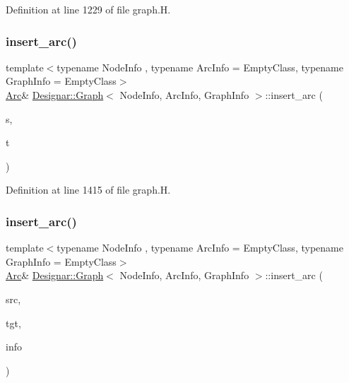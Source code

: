Definition at line 1229 of file graph.\+H.

\mbox{\label{class_designar_1_1_graph_a794e687e21db6f4e00e14c6bdc5c2907}} 
\subsubsection{\texorpdfstring{insert\+\_\+arc()}{insert\_arc()}\hspace{0.1cm}{\footnotesize\ttfamily [2/4]}}
{\footnotesize\ttfamily template$<$typename Node\+Info , typename Arc\+Info  = Empty\+Class, typename Graph\+Info  = Empty\+Class$>$ \\
\hyperlink{class_designar_1_1_graph_a74c730ef4ce2d20f998d72bd25c2b5bf}{Arc}\& \hyperlink{class_designar_1_1_graph}{Designar\+::\+Graph}$<$ Node\+Info, Arc\+Info, Graph\+Info $>$\+::insert\+\_\+arc (\begin{DoxyParamCaption}\item[{\hyperlink{class_designar_1_1_graph_a5dfc7dba9d092ac489c72e40390c37d0}{Node} \&}]{s,  }\item[{\hyperlink{class_designar_1_1_graph_a5dfc7dba9d092ac489c72e40390c37d0}{Node} \&}]{t }\end{DoxyParamCaption})\hspace{0.3cm}{\ttfamily [inline]}}



Definition at line 1415 of file graph.\+H.

\mbox{\label{class_designar_1_1_graph_ad310a106f10d0a7ff12915d8b47e8e3d}} 
\subsubsection{\texorpdfstring{insert\+\_\+arc()}{insert\_arc()}\hspace{0.1cm}{\footnotesize\ttfamily [3/4]}}
{\footnotesize\ttfamily template$<$typename Node\+Info , typename Arc\+Info  = Empty\+Class, typename Graph\+Info  = Empty\+Class$>$ \\
\hyperlink{class_designar_1_1_graph_a74c730ef4ce2d20f998d72bd25c2b5bf}{Arc}\& \hyperlink{class_designar_1_1_graph}{Designar\+::\+Graph}$<$ Node\+Info, Arc\+Info, Graph\+Info $>$\+::insert\+\_\+arc (\begin{DoxyParamCaption}\item[{\hyperlink{class_designar_1_1_graph_a5dfc7dba9d092ac489c72e40390c37d0}{Node} \&}]{src,  }\item[{\hyperlink{class_designar_1_1_graph_a5dfc7dba9d092ac489c72e40390c37d0}{Node} \&}]{tgt,  }\item[{const Arc\+Info \&}]{info }\end{DoxyParamCaption})\hspace{0.3cm}{\ttfamily [inline]}}



